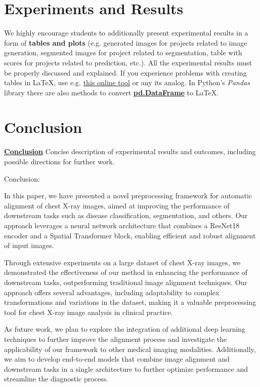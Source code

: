 \documentclass{article}
\begin{document}
\section{Experiments and Results}\label{experiments_and_results}

We highly encourage students to additionally present experimental results in a form of \textbf{tables and plots} (e.g. generated images for projects related to image generation, segmented images for project related to segmentation, table with scores for projects related to prediction, etc.). All the experimental results must be properly discussed and explained. If you experience problems with creating tables in \LaTeX, use e.g. \href{https://www.tablesgenerator.com}{this online tool} or any its analog. In Python's \textit{Pandas} library there are also methods to convert \href{https://pandas.pydata.org/pandas-docs/stable/reference/api/pandas.DataFrame.to_latex.html}{\textbf{pd.DataFrame}} to \LaTeX  .

\section{Conclusion}\label{conclusion}

\underline{\textbf{Conclusion}} Concise description of experimental results and outcomes, including possible directions for further work.

Conclusion:

In this paper, we have presented a novel preprocessing framework for automatic alignment of chest X-ray images, aimed at improving the performance of downstream tasks such as disease classification, segmentation, and others. Our approach leverages a neural network architecture that combines a ResNet18 encoder and a Spatial Transformer block, enabling efficient and robust alignment of input images.

Through extensive experiments on a large dataset of chest X-ray images, we demonstrated the effectiveness of our method in enhancing the performance of downstream tasks, outperforming traditional image alignment techniques. Our approach offers several advantages, including adaptability to complex transformations and variations in the dataset, making it a valuable preprocessing tool for chest X-ray image analysis in clinical practice.

As future work, we plan to explore the integration of additional deep learning techniques to further improve the alignment process and investigate the applicability of our framework to other medical imaging modalities. Additionally, we aim to develop end-to-end models that combine image alignment and downstream tasks in a single architecture to further optimize performance and streamline the diagnostic process.
\end{document}
